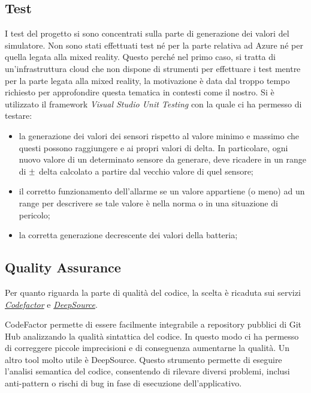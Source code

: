 \subsection{Test}
I test del progetto si sono concentrati sulla parte di generazione dei valori del simulatore. Non sono stati effettuati test né per la parte relativa ad Azure né per quella legata alla mixed reality. Questo perché nel primo caso, si tratta di un'infrastruttura cloud che non dispone di strumenti per effettuare i test mentre per la parte legata alla mixed reality, la motivazione è data dal troppo tempo richiesto per approfondire questa tematica in contesti come il nostro. \newline \newline Si è utilizzato il framework \textit{Visual Studio Unit Testing} con la quale ci ha permesso di testare:
\begin{itemize}
    \item la generazione dei valori dei sensori rispetto al valore minimo e massimo che questi possono raggiungere e ai propri valori di delta. In particolare, ogni nuovo valore di un determinato sensore da generare, deve ricadere in un range di $\mypm$ delta calcolato a partire dal vecchio valore di quel sensore;
    
    \item il corretto funzionamento dell'allarme se un valore appartiene (o meno) ad un range per descrivere se tale valore è nella norma o in una situazione di pericolo;
    
    \item la corretta generazione decrescente dei valori della batteria;
\end{itemize}

\subsection{Quality Assurance}
Per quanto riguarda la parte di qualità del codice, la scelta è ricaduta sui servizi \href{https://www.codefactor.io/}{\textit{Codefactor}} e \href{https://deepsource.io/}{\textit{DeepSource}}. \newline \par{CodeFactor} permette di essere facilmente integrabile a repository pubblici di Git Hub analizzando la qualità sintattica del codice. In questo modo ci ha permesso di correggere piccole imprecisioni e di conseguenza aumentarne la qualità. \newline \newline Un altro tool molto utile è DeepSource. Questo strumento permette di eseguire l'analisi semantica del codice, consentendo di rilevare diversi problemi, inclusi anti-pattern o rischi di bug in fase di esecuzione dell'applicativo.

